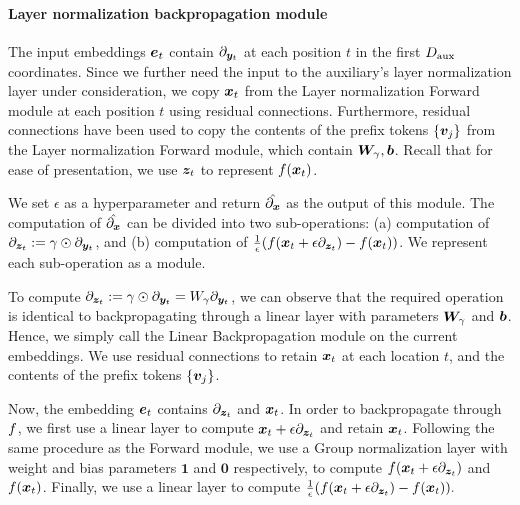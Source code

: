 \layernormapprgradient*




\paragraph{\simulator{} Layer normalization backpropagation module}
The input embeddings $\ve_t$ contain $\partial_{{\bm{y}}_t}$ at each position $t$ in the first $D_{\text{aux}}$ coordinates. Since we further need the input to the auxiliary's layer normalization layer under consideration, we copy ${\bm{x}}_t$ from the \simulator{} Layer normalization Forward module at each position $t$ using residual connections. Furthermore, residual connections have been used to copy the contents of the prefix tokens $\{ {\bm{v}}_j \}$ from the Layer normalization Forward module, which contain ${\bm{W}}_{\mathbf{\gamma}}, {\bm{b}}$. Recall that for ease of presentation, we use ${\bm{z}}_t$ to represent $f({\bm{x}}_t)$.

We set $\epsilon$ as a hyperparameter and return $\Hat{ \partial_{ {\bm{x}} } }$ as the output of this module. The computation of $\Hat{ \partial_{ {\bm{x}} } }$ can be divided into two sub-operations: (a) computation of $\partial_{{\bm{z}}_t} := \mathbf{\gamma} \odot \partial_{{\bm{y}}_t}$,  and (b) computation of $\frac{1}{\epsilon} ( f({\bm{x}}_t + \epsilon  \partial_{ {\bm{z}}_t } ) - f({\bm{x}}_t) )$. We represent each sub-operation as a \simulator{} module.

To compute $\partial_{{\bm{z}}_t} := \mathbf{\gamma} \odot \partial_{{\bm{y}}_t}  = W_{\mathbf{\gamma}} \partial_{{\bm{y}}_t}$, we can observe that the required operation is identical to backpropagating through a linear layer with parameters ${\bm{W}}_{\mathbf{\gamma}}$ and ${\bm{b}}$. Hence, we simply call the Linear Backpropagation module on the current embeddings. We use residual connections to retain ${\bm{x}}_t$ at each location $t$, and the contents of the prefix tokens $\{ {\bm{v}}_j \}$.

Now, the embedding $\ve_t$ contains $\partial_{{\bm{z}}_t}$ and  ${\bm{x}}_t$. In order to backpropagate through $f$, we first use a linear layer to compute ${\bm{x}}_t + \epsilon  \partial_{ {\bm{z}}_t }$ and retain ${\bm{x}}_t$. Following the same procedure as the Forward module, we use a Group normalization layer with weight and bias parameters $\mathbf{1}$ and $\mathbf{0}$ respectively, to compute $f({\bm{x}}_t + \epsilon  \partial_{ {\bm{z}}_t } )$ and $f({\bm{x}}_t)$. Finally, we use a linear layer to compute $ \frac{1}{\epsilon} ( f({\bm{x}}_t + \epsilon  \partial_{ {\bm{z}}_t } ) - f({\bm{x}}_t) ).$


